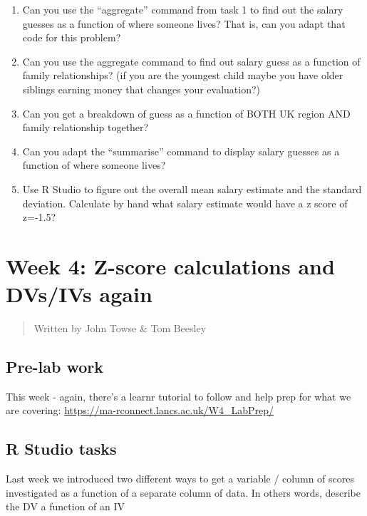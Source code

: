 \documentclass[
]{book}
\providecommand{\tightlist}{%
  \setlength{\itemsep}{0pt}\setlength{\parskip}{0pt}}
\begin{document}
\begin{enumerate}
\def\labelenumi{\Alph{enumi})}
\tightlist
\item
  Can you use the ``aggregate'' command from task 1 to find out the salary guesses as a function of where someone lives? That is, can you adapt that code for this problem?
\item
  Can you use the aggregate command to find out salary guess as a function of family relationships? (if you are the youngest child maybe you have older siblings earning money that changes your evaluation?)
\item
  Can you get a breakdown of guess as a function of BOTH UK region AND family relationship together?
\item
  Can you adapt the ``summarise'' command to display salary guesses as a function of where someone lives?
\item
  Use R Studio to figure out the overall mean salary estimate and the standard deviation. Calculate by hand what salary estimate would have a z score of z=-1.5?
\end{enumerate}

\hypertarget{week-4-z-score-calculations-and-dvsivs-again}{%
\chapter{Week 4: Z-score calculations and DVs/IVs again}\label{week-4-z-score-calculations-and-dvsivs-again}}

\begin{quote}
Written by John Towse \& Tom Beesley
\end{quote}

\hypertarget{pre-lab-work-2}{%
\section{Pre-lab work}\label{pre-lab-work-2}}

This week - again, there's a learnr tutorial to follow and help prep for what we are covering: \url{https://ma-rconnect.lancs.ac.uk/W4_LabPrep/}

\hypertarget{r-studio-tasks-2}{%
\section{R Studio tasks}\label{r-studio-tasks-2}}

Last week we introduced two different ways to get a variable / column of scores investigated as a function of a separate column of data. In others words, describe the DV a function of an IV
\end{document}
